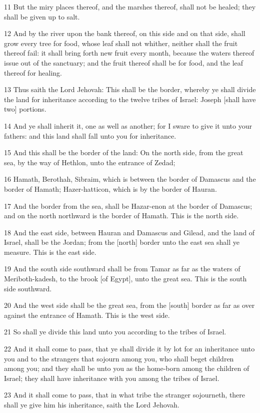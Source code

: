\par 11 But the miry places thereof, and the marshes thereof, shall not be healed; they shall be given up to salt.
\par 12 And by the river upon the bank thereof, on this side and on that side, shall grow every tree for food, whose leaf shall not whither, neither shall the fruit thereof fail: it shall bring forth new fruit every month, because the waters thereof issue out of the sanctuary; and the fruit thereof shall be for food, and the leaf thereof for healing.
\par 13 Thus saith the Lord Jehovah: This shall be the border, whereby ye shall divide the land for inheritance according to the twelve tribes of Israel: Joseph [shall have two] portions.
\par 14 And ye shall inherit it, one as well as another; for I sware to give it unto your fathers: and this land shall fall unto you for inheritance.
\par 15 And this shall be the border of the land: On the north side, from the great sea, by the way of Hethlon, unto the entrance of Zedad;
\par 16 Hamath, Berothah, Sibraim, which is between the border of Damascus and the border of Hamath; Hazer-hatticon, which is by the border of Hauran.
\par 17 And the border from the sea, shall be Hazar-enon at the border of Damascus; and on the north northward is the border of Hamath. This is the north side.
\par 18 And the east side, between Hauran and Damascus and Gilead, and the land of Israel, shall be the Jordan; from the [north] border unto the east sea shall ye measure. This is the east side.
\par 19 And the south side southward shall be from Tamar as far as the waters of Meriboth-kadesh, to the brook [of Egypt], unto the great sea. This is the south side southward.
\par 20 And the west side shall be the great sea, from the [south] border as far as over against the entrance of Hamath. This is the west side.
\par 21 So shall ye divide this land unto you according to the tribes of Israel.
\par 22 And it shall come to pass, that ye shall divide it by lot for an inheritance unto you and to the strangers that sojourn among you, who shall beget children among you; and they shall be unto you as the home-born among the children of Israel; they shall have inheritance with you among the tribes of Israel.
\par 23 And it shall come to pass, that in what tribe the stranger sojourneth, there shall ye give him his inheritance, saith the Lord Jehovah.

